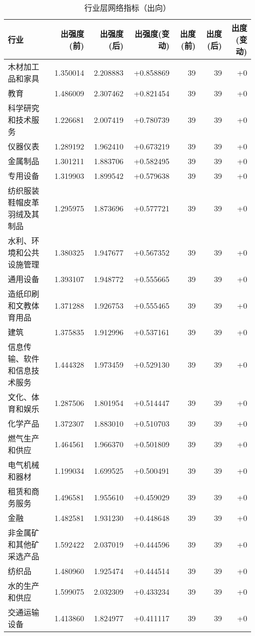 \begin{table}[htbp]
\centering
\caption{行业层网络指标（出向）}
\label{tab:industry_out_stats}
\begin{tabular}{lrrrrrr}
\toprule
行业 & 出强度(前) & 出强度(后) & 出强度(变动) & 出度(前) & 出度(后) & 出度(变动) \\
\midrule
木材加工品和家具 & 1.350014 & 2.208883 & +0.858869 & 39 & 39 & +0 \\
教育 & 1.486009 & 2.307462 & +0.821454 & 39 & 39 & +0 \\
科学研究和技术服务 & 1.226681 & 2.007419 & +0.780739 & 39 & 39 & +0 \\
仪器仪表 & 1.289192 & 1.962410 & +0.673219 & 39 & 39 & +0 \\
金属制品 & 1.301211 & 1.883706 & +0.582495 & 39 & 39 & +0 \\
专用设备 & 1.319903 & 1.899542 & +0.579638 & 39 & 39 & +0 \\
纺织服装鞋帽皮革羽绒及其制品 & 1.295975 & 1.873696 & +0.577721 & 39 & 39 & +0 \\
水利、环境和公共设施管理 & 1.380325 & 1.947677 & +0.567352 & 39 & 39 & +0 \\
通用设备 & 1.393107 & 1.948772 & +0.555665 & 39 & 39 & +0 \\
造纸印刷和文教体育用品 & 1.371288 & 1.926753 & +0.555465 & 39 & 39 & +0 \\
建筑 & 1.375835 & 1.912996 & +0.537161 & 39 & 39 & +0 \\
信息传输、软件和信息技术服务 & 1.444328 & 1.973459 & +0.529130 & 39 & 39 & +0 \\
文化、体育和娱乐 & 1.287506 & 1.801954 & +0.514447 & 39 & 39 & +0 \\
化学产品 & 1.372307 & 1.883010 & +0.510703 & 39 & 39 & +0 \\
燃气生产和供应 & 1.464561 & 1.966370 & +0.501809 & 39 & 39 & +0 \\
电气机械和器材 & 1.199034 & 1.699525 & +0.500491 & 39 & 39 & +0 \\
租赁和商务服务 & 1.496581 & 1.955610 & +0.459029 & 39 & 39 & +0 \\
金融 & 1.482581 & 1.931230 & +0.448648 & 39 & 39 & +0 \\
非金属矿和其他矿采选产品 & 1.592422 & 2.037019 & +0.444596 & 39 & 39 & +0 \\
纺织品 & 1.480960 & 1.925474 & +0.444514 & 39 & 39 & +0 \\
水的生产和供应 & 1.599075 & 2.032309 & +0.433234 & 39 & 39 & +0 \\
交通运输设备 & 1.413860 & 1.824977 & +0.411117 & 39 & 39 & +0 \\

\end{tabular}
\end{table}
